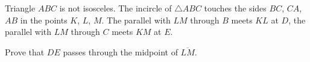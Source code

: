 Triangle $ABC$ is not isosceles. The incircle of $\triangle ABC$ touches the sides $BC$, $CA$, $AB$ in the points $K$, $L$, $M$. The parallel with $LM$ through $B$ meets $KL$ at $D$, the parallel with $LM$ through $C$ meets $KM$ at $E$.

Prove that $DE$ passes through the midpoint of $\overline{LM}$.